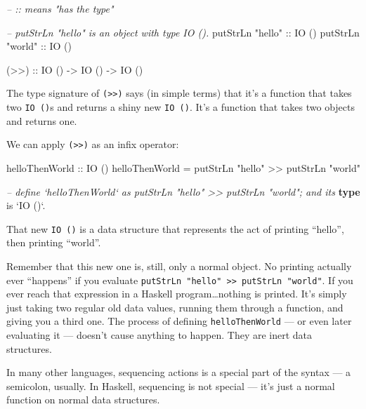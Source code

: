 \documentclass[]{article}
\newenvironment{Shaded}{}{}
\newcommand{\CommentTok}[1]{\textcolor[rgb]{0.38,0.63,0.69}{\textit{#1}}}
\newcommand{\DataTypeTok}[1]{\textcolor[rgb]{0.56,0.13,0.00}{#1}}
\newcommand{\FunctionTok}[1]{\textcolor[rgb]{0.02,0.16,0.49}{#1}}
\newcommand{\KeywordTok}[1]{\textcolor[rgb]{0.00,0.44,0.13}{\textbf{#1}}}
\newcommand{\NormalTok}[1]{#1}
\newcommand{\OtherTok}[1]{\textcolor[rgb]{0.00,0.44,0.13}{#1}}
\newcommand{\StringTok}[1]{\textcolor[rgb]{0.25,0.44,0.63}{#1}}
\begin{document}
\begin{Shaded}
\begin{Highlighting}[]
\CommentTok{-- :: means "has the type"}

\CommentTok{-- putStrLn "hello" is an object with type IO ().}
\NormalTok{putStrLn }\StringTok{"hello"}\OtherTok{ ::} \DataTypeTok{IO}\NormalTok{ ()}
\NormalTok{putStrLn }\StringTok{"world"}\OtherTok{ ::} \DataTypeTok{IO}\NormalTok{ ()}

\OtherTok{(>>) ::} \DataTypeTok{IO}\NormalTok{ () }\OtherTok{->} \DataTypeTok{IO}\NormalTok{ () }\OtherTok{->} \DataTypeTok{IO}\NormalTok{ ()}
\end{Highlighting}
\end{Shaded}

The type signature of \texttt{(\textgreater{}\textgreater{})} says (in simple
terms) that it's a function that takes two \texttt{IO\ ()}s and returns a shiny
new \texttt{IO\ ()}. It's a function that takes two objects and returns one.

We can apply \texttt{(\textgreater{}\textgreater{})} as an infix operator:

\begin{Shaded}
\begin{Highlighting}[]
\OtherTok{helloThenWorld ::} \DataTypeTok{IO}\NormalTok{ ()}
\NormalTok{helloThenWorld }\FunctionTok{=}\NormalTok{ putStrLn }\StringTok{"hello"} \FunctionTok{>>}\NormalTok{ putStrLn }\StringTok{"world"}

\CommentTok{-- define `helloThenWorld` as putStrLn "hello" >> putStrLn "world"; and its}
\KeywordTok{type}\NormalTok{ is }\OtherTok{`IO ()`}\FunctionTok{.}
\end{Highlighting}
\end{Shaded}

That new \texttt{IO\ ()} is a data structure that represents the act of printing
``hello'', then printing ``world''.

Remember that this new one is, still, only a normal object. No printing actually
ever ``happens'' if you evaluate
\texttt{putStrLn\ "hello"\ \textgreater{}\textgreater{}\ putStrLn\ "world"}. If
you ever reach that expression in a Haskell program\ldots{}nothing is printed.
It's simply just taking two regular old data values, running them through a
function, and giving you a third one. The process of defining
\texttt{helloThenWorld} --- or even later evaluating it --- doesn't cause
anything to happen. They are inert data structures.

In many other languages, sequencing actions is a special part of the syntax ---
a semicolon, usually. In Haskell, sequencing is not special --- it's just a
normal function on normal data structures.
\end{document}
